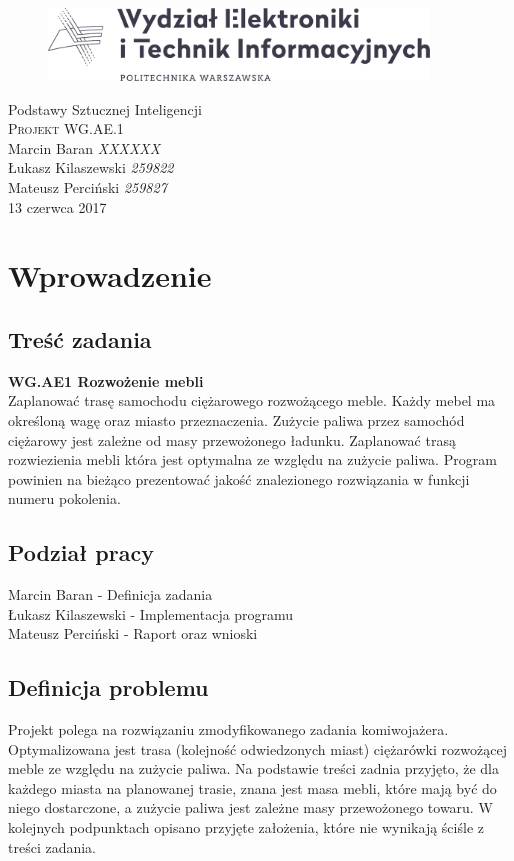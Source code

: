 \documentclass[12pt, oneside, final]{report}
\begin{document}
\begin{titlepage}
	\centering
	\begin{figure}
		\centering
		\includegraphics[width=0.9\textwidth]{logo.pdf}
	\end{figure}
	\vspace*{100pt}
	\LARGE{Podstawy Sztucznej Inteligencji}\\
	\vspace{30pt}
	\textsc{\Huge{Projekt WG.AE.1}}\\
	\vspace{120pt}
	\Large{Marcin Baran \textit{XXXXXX}}\\
	\Large{Łukasz Kilaszewski \textit{259822}}\\
	\Large{Mateusz Perciński \textit{259827}}\\
	\vfill
	\large{13 czerwca 2017}
\end{titlepage}

\thispagestyle{empty}
\tableofcontents
\cleardoublepage

\chapter{Wprowadzenie}
\section*{Treść zadania}
\textbf{WG.AE1 Rozwożenie mebli} \\
Zaplanować trasę samochodu ciężarowego rozwożącego meble. Każdy mebel ma określoną
wagę oraz miasto przeznaczenia. Zużycie paliwa przez samochód ciężarowy jest zależne od
masy przewożonego ładunku. Zaplanować trasą rozwiezienia mebli która jest optymalna ze
względu na zużycie paliwa. Program powinien na bieżąco prezentować jakość znalezionego
rozwiązania w funkcji numeru pokolenia.
\section*{Podział pracy}
Marcin Baran - Definicja zadania\\
Łukasz Kilaszewski - Implementacja programu\\
Mateusz Perciński - Raport oraz wnioski

\section{Definicja problemu}
Projekt polega na rozwiązaniu zmodyfikowanego zadania komiwojażera. Optymalizowana jest trasa (kolejność odwiedzonych miast) ciężarówki rozwożącej meble ze względu na zużycie paliwa. Na podstawie treści zadnia przyjęto, że dla każdego miasta na planowanej trasie, znana jest masa mebli, które mają być do niego dostarczone, a zużycie paliwa jest zależne masy przewożonego towaru. W kolejnych podpunktach opisano przyjęte założenia, które nie wynikają ściśle z treści zadania.
\end{document}
